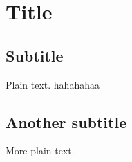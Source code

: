 \documentclass{article}
\begin{document}
\section{Title}

\subsection{Subtitle}

Plain text.
hahahahaa

\subsection{Another subtitle}

More plain text.
\end{document}
